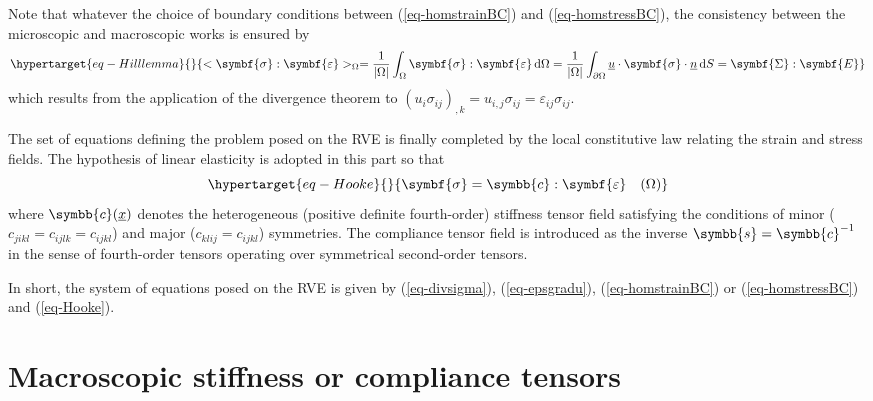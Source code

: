 \documentclass[
  letterpaper,
  DIV=11,
  numbers=noendperiod]{scrreprt}
\newcommand{\uu}[1]{{\symbf{{#1}}}}
\newcommand{\uuuu}[1]{{\symbb{{#1}}}}
\newcommand{\uv}[1]{{\underline{{#1}}}}
\newcommand{\x}{{\uv{{x}}}}
\newcommand{\n}{{\uv{{n}}}}
\newcommand{\eps}{{\uu{{\varepsilon}}}}
\newcommand{\E}{{\uu{{E}}}}
\newcommand{\sig}{{\uu{{\sigma}}}}
\newcommand{\Sig}{{\uu{{\Sigma}}}}
\newcommand{\ud}{{\,\mathrm{d}}}
\begin{document}
\begin{tcolorbox}[enhanced jigsaw, coltitle=black, opacitybacktitle=0.6, title=\textcolor{quarto-callout-note-color}{\faInfo}\hspace{0.5em}{Hill lemma}, opacityback=0, rightrule=.15mm, toprule=.15mm, bottomtitle=1mm, toptitle=1mm, left=2mm, colback=white, titlerule=0mm, arc=.35mm, breakable, colframe=quarto-callout-note-color-frame, bottomrule=.15mm, leftrule=.75mm, colbacktitle=quarto-callout-note-color!10!white]

Note that whatever the choice of boundary conditions between
(\ref{eq-homstrainBC}) and (\ref{eq-homstressBC}), the consistency
between the microscopic and macroscopic works is ensured by
\begin{equation}\protect\hypertarget{eq-Hilllemma}{}{
<\sig:\eps>_{\Omega}
=\frac{1}{\lvert \Omega \rvert}\int_\Omega \sig:\eps\ud \Omega
=\frac{1}{\lvert \Omega \rvert}\int_{\partial\Omega} \uv{u}\cdot\sig\cdot\n \ud S
=\Sig:\E
}\label{eq-Hilllemma}\end{equation} which results from the application
of the divergence theorem to
\((u_i\sigma_{ij})_{,k}=u_{i,j}\sigma_{ij}=\varepsilon_{ij}\sigma_{ij}\).

\end{tcolorbox}

The set of equations defining the problem posed on the RVE is finally
completed by the local constitutive law relating the strain and stress
fields. The hypothesis of linear elasticity is adopted in this part so
that \begin{equation}\protect\hypertarget{eq-Hooke}{}{
\sig=\uuuu{c}:\eps \quad(\Omega)
}\label{eq-Hooke}\end{equation} where \(\uuuu{c}(\x)\) denotes the
heterogeneous (positive definite fourth-order) stiffness tensor field
satisfying the conditions of minor (\(c_{jikl}=c_{ijlk}=c_{ijkl}\)) and
major (\(c_{klij}=c_{ijkl}\)) symmetries. The compliance tensor field is
introduced as the inverse \(\uuuu{s}=\uuuu{c}^{-1}\) in the sense of
fourth-order tensors operating over symmetrical second-order tensors.

In short, the system of equations posed on the RVE is given by
(\ref{eq-divsigma}), (\ref{eq-epsgradu}), (\ref{eq-homstrainBC}) or
(\ref{eq-homstressBC}) and (\ref{eq-Hooke}).

\hypertarget{sec-basics_elas_mac_stiff}{%
\section{Macroscopic stiffness or compliance
tensors}\label{sec-basics_elas_mac_stiff}}
\end{document}
